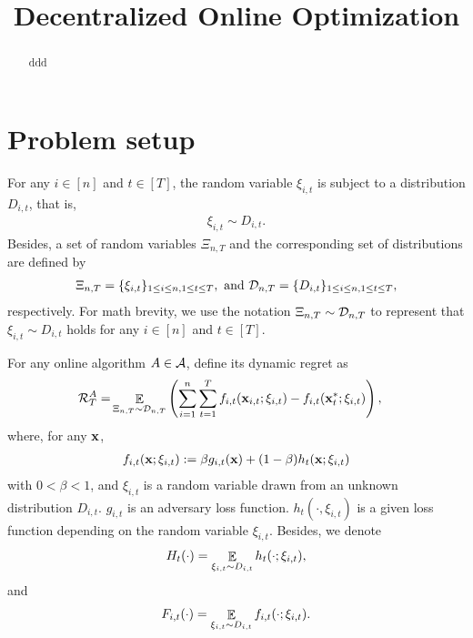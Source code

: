 \documentclass{article}
\title{Decentralized Online Optimization}
\begin{document}
\maketitle

\begin{abstract}








ddd
\end{abstract}

\section{Problem setup}

For any $i\in[n]$ and $t\in[T]$, the random variable $\xi_{i,t}$ is subject to a distribution $D_{i,t}$, that is,
\begin{align}
\nonumber
\xi_{i,t} \sim D_{i,t}.
\end{align} Besides, a set of random variables $\Xi_{n,T}$ and the corresponding set of distributions are defined by
\begin{align}
\nonumber
\Xi_{n,T} = \{ \xi_{i,t} \}_{1\le i \le n, 1 \le t \le T}, \text{~and~} \mathcal{D}_{n,T} = \{ D_{i,t} \}_{1\le i \le n, 1 \le t \le T},
\end{align} respectively. For math brevity, we use the notation $\Xi_{n,T} \sim \mathcal{D}_{n,T}$ to represent that $\xi_{i,t} \sim D_{i,t}$ holds for any $i\in[n]$ and $t\in[T]$.  





For any online algorithm $A \in {\mathcal{A}}$, define its dynamic regret as
\begin{align}
\nonumber
{\mathcal{R}}_T^{A} = & \mathop{\mathbb{E}}_{ \Xi_{n,T} \sim \mathcal{D}_{n,T} } \left(  \sum_{i=1}^n\sum_{t=1}^T f_{i,t}({\bf x}_{i,t};\xi_{i,t}) - f_{i,t}({\bf x}_t^\ast;\xi_{i,t})  \right),
\end{align} where, for any ${\bf x}$,
\begin{align}
\nonumber
f_{i,t}({\bf x};\xi_{i,t}) := \beta g_{i,t}({\bf x}) + (1-\beta) h_t({\bf x}; \xi_{i,t})
\end{align} with $0<\beta<1$, and $\xi_{i,t}$ is a random variable drawn from an unknown distribution $D_{i,t}$. $g_{i,t}$ is an adversary loss function. $h_t(\cdot, \xi_{i,t})$ is a given loss function depending on the random variable $\xi_{i,t}$. Besides, we denote 
\begin{align}
\nonumber
H_t(\cdot) = \mathop{\mathbb{E}}_{\xi_{i,t} \sim D_{i,t}} h_t(\cdot; \xi_{i,t}),
\end{align} and 
\begin{align}
\nonumber
F_{i,t}(\cdot) = \mathop{\mathbb{E}}_{\xi_{i,t} \sim D_{i,t}} f_{i,t}(\cdot; \xi_{i,t}).
\end{align}
\end{document}
